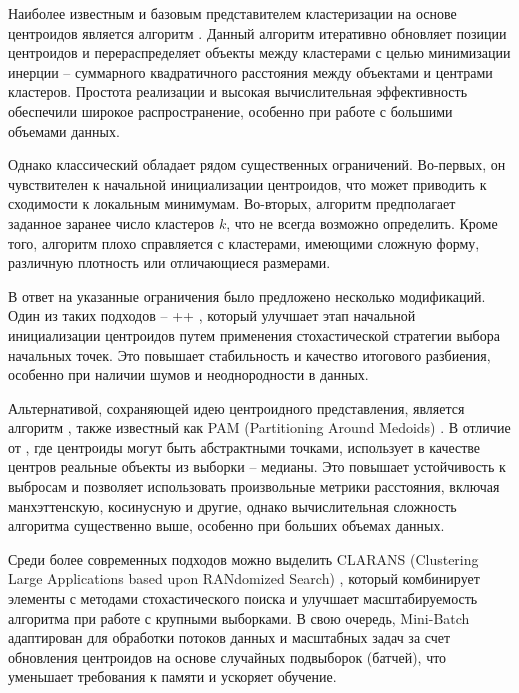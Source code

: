             Наиболее известным и базовым представителем  кластеризации на основе центроидов является алгоритм \kmeans{} \cite{Lloyd1982kmeans}. Данный алгоритм итеративно обновляет позиции центроидов и перераспределяет объекты между кластерами с целью минимизации инерции -- суммарного квадратичного расстояния между объектами и центрами кластеров. Простота реализации и высокая вычислительная эффективность обеспечили \kmeans{} широкое распространение, особенно при работе с большими объемами данных.

            Однако классический \kmeans{} обладает рядом существенных ограничений. Во-первых, он чувствителен к начальной инициализации центроидов, что может приводить к сходимости к локальным минимумам. Во-вторых, алгоритм предполагает заданное заранее число кластеров \(k\), что не всегда возможно определить. Кроме того, алгоритм плохо справляется с кластерами, имеющими сложную форму, различную плотность или отличающиеся размерами.

            В ответ на указанные ограничения было предложено несколько модификаций. Один из таких подходов -- \kmeans{}++ \cite{Arthur2010kmeans++}, который улучшает этап начальной инициализации центроидов путем применения стохастической стратегии выбора начальных точек. Это повышает стабильность и качество итогового разбиения, особенно при наличии шумов и неоднородности в данных.

            Альтернативой, сохраняющей идею центроидного представления, является алгоритм \kmedoids{}, также известный как PAM (Partitioning Around Medoids) \cite{kaufman2008kmedioids}. В отличие от \kmeans{}, где центроиды могут быть абстрактными точками, \kmedoids{} использует в качестве центров реальные объекты из выборки -- медианы. Это повышает устойчивость к выбросам и позволяет использовать произвольные метрики расстояния, включая манхэттенскую, косинусную и другие, однако вычислительная сложность алгоритма существенно выше, особенно при больших объемах данных.

            Среди более современных подходов можно выделить CLARANS (Clustering Large Applications based upon RANdomized Search) \cite{Ng1994clarans}, который комбинирует элементы \kmedoids{} с методами стохастического поиска и улучшает масштабируемость алгоритма при работе с крупными выборками. В свою очередь, Mini-Batch \kmeans{} \cite{Sculley2010minibatch} адаптирован для обработки потоков данных и масштабных задач за счет обновления центроидов на основе случайных подвыборок (батчей), что уменьшает требования к памяти и ускоряет обучение.


